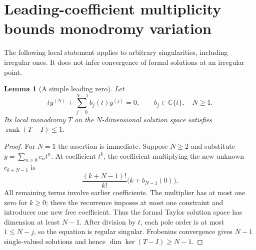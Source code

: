 \documentclass[11pt,a4paper]{article}
\newtheorem{lemma}[theorem]{Lemma}
\theoremstyle{definition}
\theoremstyle{remark}
\numberwithin{equation}{section}
\begin{document}
\clearpage
\begingroup\small

\section{Leading-coefficient multiplicity bounds monodromy variation}
\label{p7:mm:section}

The following local statement applies to arbitrary singularities, including
irregular ones. It does not infer convergence of formal solutions at an
irregular point.

\begin{lemma}[A simple leading zero]\label{p7:mm:simple}
Let
\[
 t y^{(N)}+\sum_{j=0}^{N-1}b_j(t)y^{(j)}=0,
 \qquad b_j\in\mathbb C\{t\},\quad N\ge1.
\]
Its local monodromy $T$ on the $N$-dimensional solution space satisfies
$\operatorname{rank}(T-I)\le1$.
\end{lemma}
\begin{proof}
For $N=1$ the assertion is immediate. Suppose $N\ge2$ and substitute
$y=\sum_{n\ge0}c_nt^n$. At coefficient $t^k$, the coefficient multiplying
the new unknown $c_{k+N-1}$ is
\[
 \frac{(k+N-1)!}{k!}\bigl(k+b_{N-1}(0)\bigr).
\]
All remaining terms involve earlier coefficients. The multiplier has
at most one zero for $k\ge0$; there the recurrence imposes at most one
constraint and introduces one new free coefficient. Thus the formal
Taylor solution space has dimension at least $N-1$. After division by
$t$, each pole order is at most $1\le N-j$, so the equation is regular
singular. Frobenius convergence gives $N-1$ single-valued solutions
and hence $\dim\ker(T-I)\ge N-1$.
\end{proof}
\end{document}
